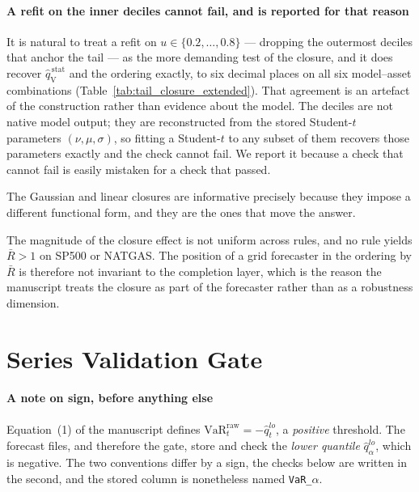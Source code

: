 \documentclass[preprint,11pt,authoryear]{elsarticle}
\newcommand{\VaR}{\mathrm{VaR}}
\newcommand{\1}{\boldsymbol{1}}
\newcommand{\qVstat}{\hat{q}_{\scriptscriptstyle\mathrm{V}}^{\,\mathrm{stat}}}
\begin{document}
\paragraph{A refit on the inner deciles cannot fail, and is reported for that
reason} It is natural to treat a refit on $u \in \{0.2, \ldots, 0.8\}$ ---
dropping the outermost deciles that anchor the tail --- as the more demanding
test of the closure, and it does recover $\qVstat$ and the ordering exactly, to
six decimal places on all six model--asset combinations
(Table~\ref{tab:tail_closure_extended}). That agreement is an artefact of the
construction rather than evidence about the model. The deciles are not native
model output; they are reconstructed from the stored Student-$t$ parameters
$(\nu, \mu, \sigma)$, so fitting a Student-$t$ to any subset of them recovers
those parameters exactly and the check cannot fail. We report it because a check
that cannot fail is easily mistaken for a check that passed.

The Gaussian and linear closures are informative precisely because they impose a
different functional form, and they are the ones that move the answer.



The magnitude of the closure effect is not uniform across rules, and no rule
yields $\bar R > 1$ on SP500 or NATGAS. The position of a grid forecaster in the
ordering by $\bar R$ is therefore not invariant to the completion layer, which is
the reason the manuscript treats the closure as part of the forecaster rather
than as a robustness dimension.



\section{Series Validation Gate}
\label{app:validation_gate}

\paragraph{A note on sign, before anything else} Equation~(1) of the manuscript
defines $\VaR_t^{\mathrm{raw}} = -\hat q_t^{lo}$, a \emph{positive} threshold.
The forecast files, and therefore the gate, store and check the \emph{lower
quantile} $\hat q^{lo}_\alpha$, which is negative. The two conventions differ by
a sign, the checks below are written in the second, and the stored column is
nonetheless named \texttt{VaR\_}$\alpha$.
\end{document}
